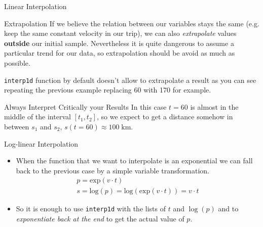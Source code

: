 \documentclass{beamer}
\begin{document}
\begin{frame}{Linear Interpolation}
  \begin{block}{Extrapolation}
    If we believe the relation between our variables stays the same (e.g. keep the same constant velocity in our trip), we can also \emph{extrapolate} values \textbf{outside} our initial sample.
    Nevertheless it is quite dangerous to assume a particular trend for our data, so extrapolation should be avoid as much as possible.

    \texttt{interp1d} function by default doesn't allow to extrapolate a result as you can see repeating the previous example replacing 60 with 170 for example.
  \end{block}

  \begin{block}{Always Interpret Critically your Results}
    In this case $t=60$ is almost in the middle of the interval $[t_1, t_2]$, so we expect to get a distance somehow in between $s_1$ and $s_2$, $s(t=60) \approx 100\;\textrm{km}$.
  \end{block}
  \end{frame}

\begin{frame}{Log-linear Interpolation}
  \begin{itemize}
    \item When the function that we want to interpolate is an exponential we can fall back to the previous case by a simple variable transformation. 
      \begin{equation}
        \begin{gathered}
          p = \mathrm{exp}(v \cdot t) \\
          s = \mathrm{log}(p) = \mathrm{log}(\mathrm{exp}(v \cdot t)) = v \cdot t
        \end{gathered}
      \end{equation}

    \item So it is enough to use \texttt{interp1d} with the lists of $t$ and $\log(p)$ and to \emph{exponentiate back at the end} to get the actual value of $p$.
  \end{itemize}
\end{frame}

\end{document}
